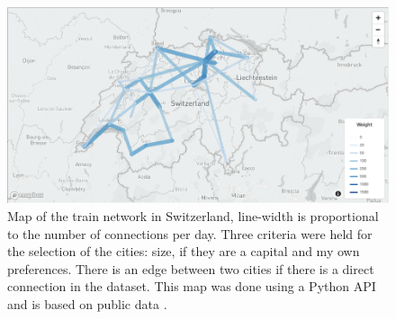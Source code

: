 \documentclass[a4paper,11pt,twoside=semi,openright]{report}
\begin{document}
\begin{figure}[!h] 
\centering
\includegraphics[width=450pt]{figures/mapCFF}
\caption{Map of the train network in Switzerland, line-width is proportional to
    the number of connections per day. Three criteria were held for the
    selection of the cities: size, if they are a capital and my own
    preferences. There is an edge between two cities if there is a direct
    connection in the dataset. This map was done using a Python API
    \cite{MapBox} and is based on public data \cite{OpenData}. }
    \label{fig:CFF-map}
\end{figure}
\end{document}
